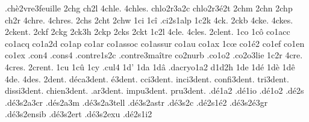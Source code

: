 {                    .chè2vre3feuille %
2chg
ch2l
4chle.
4chles.
                    chlo2r3a2c
                    chlo2r3é2t
2chm
2chn
2chp
ch2r
4chre.
4chres.
2chs
2cht
2chw
1ci
1cî
                    .ci2s1alp
1c2k
4ck.
2ckb
4cke.
4ckes.
2ckent. %
2ckf
2ckg
2ck3h
2ckp
2cks
2ckt
1c2l
4cle.
4cles.
2clent. %
1co
1cô
                    co1acc
                    co1acq
                    co1a2d
                    co1ap
                    co1ar
                    co1assoc
                    co1assur
                    co1au
                    co1ax
1cœ
                    co1é2
                    co1ef
                    co1en
                    co1ex
                    .con4  %
                    .cons4 %
                    .contre1s2c
                    .contre3maître %
                    co2nurb
                    .co1o2
                    .co2o3lie
1c2r
4cre.
4cres.
2crent. %
1cu
1cû
1cy
.cul4 %
1d'
1da
1dâ
                    .dacryo1a2
d1d2h
1de
1dé
1dè
1dê
4de.
4des.
     2dent.
 déca3dent.
    é3dent.
  cci3dent.
 inci3dent.
confi3dent.
  tri3dent.
dissi3dent.
chien3dent.
  .ar3dent.
 impu3dent.
  pru3dent.
%
                    .dé1a2
                    .dé1io
                    .dé1o2
                    .dé2s %
                    .dé3s2a3cr
                    .dés2a3m %
                    .dé3s2a3tell
                    .dé3s2astr
                    .dé3s2c %
                    .dé2s1é2
                    .dé3s2é3gr
                    .dé3s2ensib
                    .dé3s2ert
                    .dé3s2exu
                    .dé2s1i2
}
